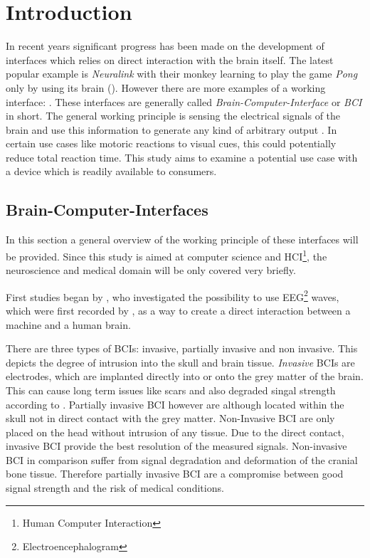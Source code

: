 
    \chapter{Introduction}



        In recent years significant progress has been made on the development of interfaces which relies on direct interaction with the brain itself.  The latest popular example is \textit{Neuralink} with their monkey learning to play the game \textit{Pong} only by using its brain (\cite{Neuralink.2021}). However there are more examples of a working interface: .
        These interfaces are generally called \textit{Brain-Computer-Interface} or \textit{BCI} in short. The general working principle is sensing the electrical signals of the brain and use this information to generate any kind of arbitrary output . 
        In certain use cases like motoric reactions to visual cues, this could potentially reduce total reaction time. This study aims to examine a potential use case with a device which is readily available to consumers.
        

        \section{Brain-Computer-Interfaces}

            In this section a general overview of the working principle of these interfaces will be provided. Since this study is aimed at computer science and HCI\footnote{Human Computer Interaction}, the neuroscience and medical domain will be only covered very briefly.


            First studies began by \cite{Vidal.1973}, who investigated the possibility to use EEG\footnote{Electroencephalogram} waves, which were first recorded by \cite{Berger.1929}, as a way to create a direct interaction between a machine and a human brain. 

            There are three types of BCIs: invasive, partially invasive and non invasive. This depicts the degree of intrusion into the skull and brain tissue. \textit{Invasive} BCIs are electrodes, which are implanted directly into or onto the grey matter of the brain. This can cause long term issues like scars and also degraded singal strength according to \cite{Abdulkader.2015}. 
            Partially invasive BCI however are although located within the skull not in direct contact with the grey matter.
            Non-Invasive BCI are only placed on the head without intrusion of any tissue.
            Due to the direct contact, invasive BCI provide the best resolution of the measured signals. Non-invasive BCI in comparison suffer from signal degradation and deformation of the cranial bone tissue. 
            Therefore partially invasive BCI are a compromise between good signal strength and the risk of medical conditions.

